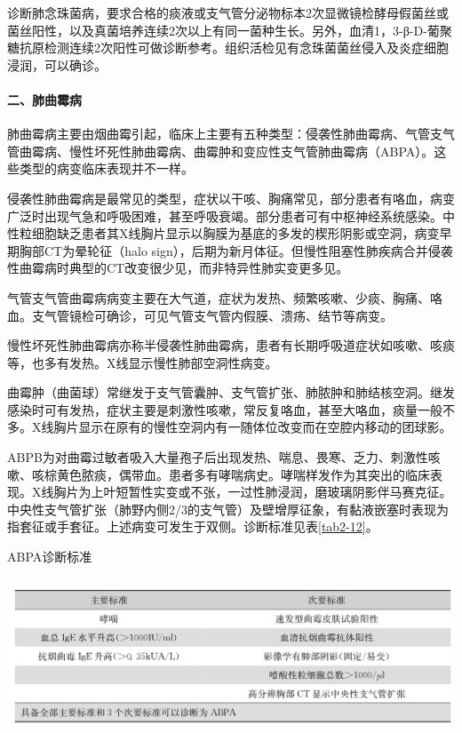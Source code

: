 诊断肺念珠菌病，要求合格的痰液或支气管分泌物标本2次显微镜检酵母假菌丝或菌丝阳性，以及真菌培养连续2次以上有同一菌种生长。另外，血清1，3-β-D-葡聚糖抗原检测连续2次阳性可做诊断参考。组织活检见有念珠菌菌丝侵入及炎症细胞浸润，可以确诊。

\paragraph{二、肺曲霉病}

肺曲霉病主要由烟曲霉引起，临床上主要有五种类型：侵袭性肺曲霉病、气管支气管曲霉病、慢性坏死性肺曲霉病、曲霉肿和变应性支气管肺曲霉病（ABPA）。这些类型的病变临床表现并不一样。

侵袭性肺曲霉病是最常见的类型，症状以干咳、胸痛常见，部分患者有咯血，病变广泛时出现气急和呼吸困难，甚至呼吸衰竭。部分患者可有中枢神经系统感染。中性粒细胞缺乏患者其X线胸片显示以胸膜为基底的多发的楔形阴影或空洞，病变早期胸部CT为晕轮征（halo
sign），后期为新月体征。但慢性阻塞性肺疾病合并侵袭性曲霉病时典型的CT改变很少见，而非特异性肺实变更多见。

气管支气管曲霉病病变主要在大气道，症状为发热、频繁咳嗽、少痰、胸痛、咯血。支气管镜检可确诊，可见气管支气管内假膜、溃疡、结节等病变。

慢性坏死性肺曲霉病亦称半侵袭性肺曲霉病，患者有长期呼吸道症状如咳嗽、咳痰等，也多有发热。X线显示慢性肺部空洞性病变。

曲霉肿（曲菌球）常继发于支气管囊肿、支气管扩张、肺脓肿和肺结核空洞。继发感染时可有发热，症状主要是刺激性咳嗽，常反复咯血，甚至大咯血，痰量一般不多。X线胸片显示在原有的慢性空洞内有一随体位改变而在空腔内移动的团球影。

ABPB为对曲霉过敏者吸入大量孢子后出现发热、喘息、畏寒、乏力、刺激性咳嗽、咳棕黄色脓痰，偶带血。患者多有哮喘病史。哮喘样发作为其突出的临床表现。X线胸片为上叶短暂性实变或不张，一过性肺浸润，磨玻璃阴影伴马赛克征。中央性支气管扩张（肺野内侧2/3的支气管）及壁增厚征象，有黏液嵌塞时表现为指套征或手套征。上述病变可发生于双侧。诊断标准见表\ref{tab2-12}。

\begin{table}[htbp]
\centering
\caption{ABPA诊断标准}
\label{tab2-12}
\includegraphics[width=5.97917in,height=1.84375in]{./images/Image00017.jpg}
\end{table}

